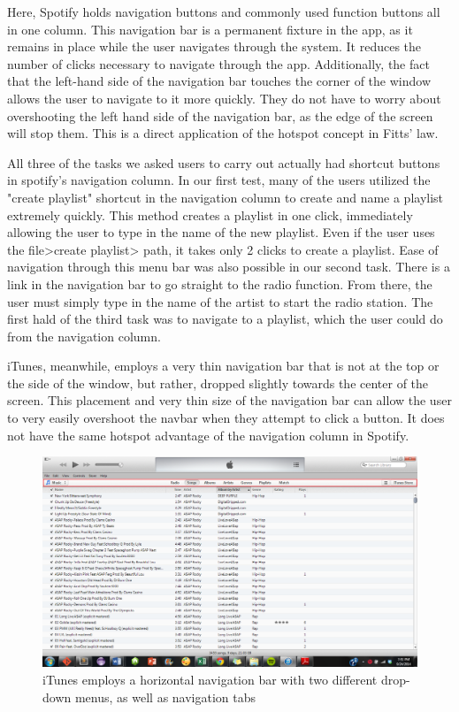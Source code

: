 \documentclass[12pt]{report}
\begin{document}
Here, Spotify holds navigation buttons and commonly used function buttons all in one column. This navigation bar is a permanent fixture in the app, as it remains in place while the user navigates through the system. It reduces the number of clicks necessary to navigate through the app. Additionally, the fact that the left-hand side of the navigation bar touches the corner of the window allows the user to navigate to it more quickly. They do not have to worry about overshooting the left hand side of the navigation bar, as the edge of the screen will stop them. This is a direct application of the hotspot concept in Fitts' law.

 All three of the tasks we asked users to carry out actually had shortcut buttons in spotify's navigation column. In our first test, many of the users utilized the "create playlist" shortcut in the navigation column to create and name a playlist extremely quickly. This method creates a playlist in one click, immediately allowing the user to type in the name of the new playlist. Even if the user uses the file>create playlist> path, it takes only 2 clicks to create a playlist. Ease of navigation through this menu bar was also possible in our second task. There is a link in the navigation bar to go straight to the radio function. From there, the user must simply type in the name of the artist to start the radio station. The first hald of the third task was to navigate to a playlist, which the user could do from the navigation column.

iTunes, meanwhile, employs a very thin navigation bar that is not at the top or the side of the window, but rather, dropped slightly towards the center of the screen. This placement and very thin size of the navigation bar can allow the user to very easily overshoot the navbar when they attempt to click a button. It does not have the same hotspot advantage of the navigation column in Spotify.

\begin{figure}[H]
	\centering
	\includegraphics[width=\textwidth]{chart5.png}
	\caption{iTunes employs a horizontal navigation bar with two different drop-down menus, as well as navigation tabs}
\end{figure}
\end{document}
